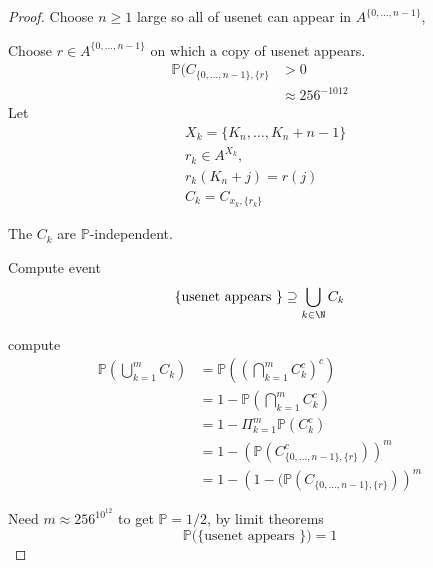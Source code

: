 \begin{proof}
	Choose $n \geq 1$ large so all of usenet can appear in $A ^{\{0,\ldots,n-1\}}$,

	Choose  $r \in A^{\{0,\ldots,n-1\}} $ on which a copy of usenet appears.
	\begin{align*}
		\mathbb{P}(C_{\{0,\ldots, n-1\}, \{r\}} &> 0 \\
												&\approx 256^{-1012}
	\end{align*}
	Let
	\begin{align*}
		&X_k = \{ K_n, \ldots, K_n + n-1 \} \\
		&r_k \in A^{X_k}, \\
		&r_k(K_n + j) = r(j) \\
		&C_k = C_{x_k, \{r_k\}}
	\end{align*}
	
	The $C_k$ are $\mathbb{P}$-independent.

	Compute event 
	\[
		\{\text{usenet appears \}} \contains \bigcup_{k \in \N} C_k
	\] 
	 
	compute
	\begin{align*}
		\mathbb{P}( \bigcup_{k=1}^{m} C_k ) &= \mathbb{P}((\bigcap_{k=1}^{m} C_{k}^c )^c) \\
											&= 1 - \mathbb{P} ( \bigcap_{k=1}^{m} C_{k}^c ) \\
											&= 1 - \Pi_{k=1}^{m} \mathbb{P}(C_k^c) \\
											&= 1 - \left(\mathbb{P}(C^c_{\{0, \ldots, n-1\}, \{r\}})\right)^m \\
											&= 1 - \left(1 - (\mathbb{P}(C_{\{0, \ldots, n-1\}, \{r\}})\right)^m
	\end{align*} 

	Need $m \approx 256^{10^12}$ to get $\mathbb{P} = 1/2$, by limit theorems
	\[
		\mathbb{P}(\{\text{usenet appears \})} = 1
	\] 
\end{proof}

